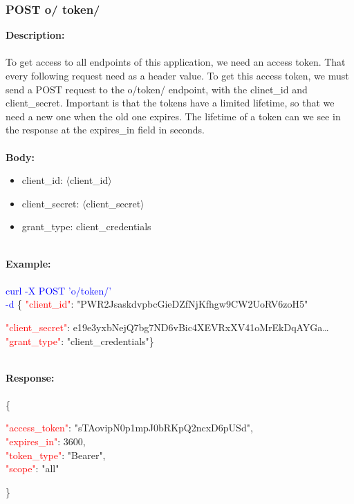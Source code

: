 \subsubsection{POST o/ token/}

\textbf{Description:}\\
\ \\
To get access to all endpoints of this application, we need an access token. That every following request need as a header value. To get this access token, we must send a POST request to the o/token/ endpoint, with the clinet\_id and client\_secret. Important is that the tokens have a limited lifetime, so that we need a new one when the old one expires. The lifetime of a token can we see in the response at the expires\_in field in seconds. \\
\ \\
\textbf{Body:}
\begin{itemize}
    \item client\_id: $\langle$client\_id$\rangle$
    \item client\_secret: $\langle$client\_secret$\rangle$
    \item grant\_type: client\_credentials
\end{itemize}
\ \\
\textbf{Example:} \\
\ \\
\textcolor{blue}{curl -X POST '\BaseURL o/token/'}\\
\textcolor{blue}{-d} \{ 
     \textcolor{red}{"client\_id"}: "PWR2JsaskdvpbcGieDZfNjKfhgw9CW2UoRV6zoH5" 
     \begin{adjustwidth}{7.5 mm}{0 cm}
        \textcolor{red}{"client\_secret"}: e19e3yxbNejQ7bg7ND6vBic4XEVRxXV41oMrEkDqAYGa\dots\\
        \textcolor{red}{"grant\_type"}: "client\_credentials"\}
     \end{adjustwidth}
\ \\
\textbf{Response:}\\
\ \\
\{
\begin{adjustwidth}{7.5 mm}{0 cm}
    \textcolor{red}{"access\_token"}: "sTAovipN0p1mpJ0bRKpQ2ncxD6pUSd",\\
    \textcolor{red}{"expires\_in"}: 3600,\\
    \textcolor{red}{"token\_type"}: "Bearer",\\
    \textcolor{red}{"scope"}: "all"
\end{adjustwidth}
\}
